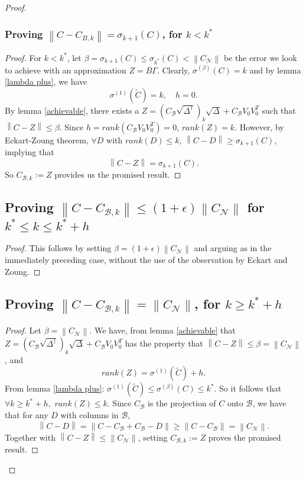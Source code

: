\documentclass[11pt]{article}
\newcommand{\norm}[1]{\left\|#1\right\|}
\newcommand{\B}{\mathcal{B}}
\newcommand{\N}{\mathcal{N}}
\newcommand{\G}{\Gamma}
\newcommand{\0}{\ensuremath{\mathbf{0}}}
\renewcommand{\>}{\succ}
\newcommand{\<}{\prec}
\begin{document}
\begin{proof}
\subsubsection{Proving $\norm{C - C_{B, k}} = \sigma_{k+1}(C)$, for $k < k^*$}
\begin{proof}
For $k < k^*$, let $\beta = \sigma_{k+1}(C) \leq \sigma_{k^*} (C) < \norm{C_{\N}}$ be the error we look to achieve with an approximation $Z = B \G$. Clearly, $\sigma^{(\beta)} (C) = k$ and by lemma \ref{lambda plus}, we have
\[ \sigma^{(1)}(\tilde{C}) = k, \quad h = 0. \]
By lemma \ref{achievable}, there exists a $Z=(C_{\B} \sqrt{\Delta^{\dagger}})_k \sqrt{\Delta} +C_{\B} V_0V_0^T$ such that $\norm{C - Z} \leq \beta$. Since $h = rank(C_{\B} V_0V_0^T) = 0$, $rank(Z) = k$. However, by Eckart-Zoung theorem, $\forall D$ with $rank(D) \leq k$, $\norm{C - D} \geq \sigma_{k+1} (C)$, implying that
\[ \norm{C - Z} = \sigma_{k+1}(C).\]
So $C_{\B, k} := Z$ provides us the promised result.
\end{proof}

\subsection{Proving $\norm{C - C_{\B, k}} \leq (1 + \epsilon) \norm{C_{\N}}$ for $k^* \leq k \leq k^* + h$}
\begin{proof}
This follows by setting $\beta = (1 + \epsilon)\norm{C_{\N}}$ and arguing as in the immediately preceding case, without the use of the observation by Eckart and Zoung.
\end{proof}

\subsection{Proving $\norm{C- C_{\B, k}} = \norm{C_{\N}}$, for $k \geq k^* + h$}
\begin{proof}
Let $\beta = \norm{C_{\N}}$. We have, from lemma \ref{achievable} that $Z = (C_{\B} \sqrt{\Delta^{\dagger}})_k \sqrt{\Delta} +C_{\B} V_0V_0^T$ has the property that $\norm{C - Z} \leq \beta = \norm{C_{\N}}$, and 
\[ rank(Z) = \sigma^{(1)}(\tilde{C}) + h. \]
From lemma \ref{lambda plus}: $\sigma^{(1)}(\tilde C) \leq \sigma^{(\beta)}(C) \leq k^*$. So it follows that $\forall k \geq k^* + h,$ $rank(Z) \leq k$. Since $C_{\B}$ is the projection of $C$ onto $\B$, we have that for any $D$ with columns in $\B$,
\[ \norm{C - D} = \norm{C - C_{\B} + C_{\B} - D} \geq \norm{C - C_{\B}} = \norm{C_{\N}}.\]
Together with $\norm{C - Z}  \leq \norm{C_{\N}}$, setting $C_{\B, k} := Z$ proves the promised result.
\end{proof}


\end{proof}
\end{document}
